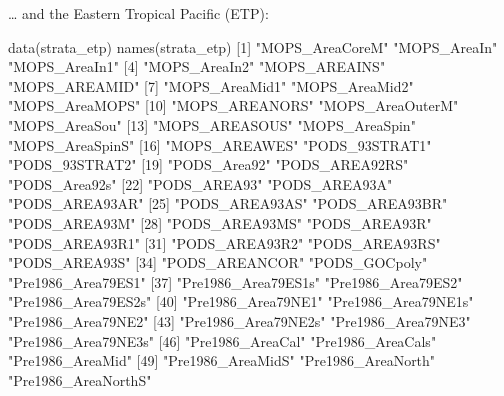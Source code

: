 \documentclass[
]{book}
\newenvironment{Shaded}{\begin{snugshade}}{\end{snugshade}}
\newcommand{\DecValTok}[1]{\textcolor[rgb]{0.00,0.00,0.81}{#1}}
\newcommand{\FunctionTok}[1]{\textcolor[rgb]{0.00,0.00,0.00}{#1}}
\newcommand{\NormalTok}[1]{#1}
\newcommand{\StringTok}[1]{\textcolor[rgb]{0.31,0.60,0.02}{#1}}
\begin{document}
\ldots{} and the Eastern Tropical Pacific (ETP):

\begin{Shaded}
\begin{Highlighting}[]
\FunctionTok{data}\NormalTok{(strata\_etp) }
\FunctionTok{names}\NormalTok{(strata\_etp)}
\NormalTok{ [}\DecValTok{1}\NormalTok{] }\StringTok{"MOPS\_AreaCoreM"}     \StringTok{"MOPS\_AreaIn"}        \StringTok{"MOPS\_AreaIn1"}      
\NormalTok{ [}\DecValTok{4}\NormalTok{] }\StringTok{"MOPS\_AreaIn2"}       \StringTok{"MOPS\_AREAINS"}       \StringTok{"MOPS\_AREAMID"}      
\NormalTok{ [}\DecValTok{7}\NormalTok{] }\StringTok{"MOPS\_AreaMid1"}      \StringTok{"MOPS\_AreaMid2"}      \StringTok{"MOPS\_AreaMOPS"}     
\NormalTok{[}\DecValTok{10}\NormalTok{] }\StringTok{"MOPS\_AREANORS"}      \StringTok{"MOPS\_AreaOuterM"}    \StringTok{"MOPS\_AreaSou"}      
\NormalTok{[}\DecValTok{13}\NormalTok{] }\StringTok{"MOPS\_AREASOUS"}      \StringTok{"MOPS\_AreaSpin"}      \StringTok{"MOPS\_AreaSpinS"}    
\NormalTok{[}\DecValTok{16}\NormalTok{] }\StringTok{"MOPS\_AREAWES"}       \StringTok{"PODS\_93STRAT1"}      \StringTok{"PODS\_93STRAT2"}     
\NormalTok{[}\DecValTok{19}\NormalTok{] }\StringTok{"PODS\_Area92"}        \StringTok{"PODS\_AREA92RS"}      \StringTok{"PODS\_Area92s"}      
\NormalTok{[}\DecValTok{22}\NormalTok{] }\StringTok{"PODS\_AREA93"}        \StringTok{"PODS\_AREA93A"}       \StringTok{"PODS\_AREA93AR"}     
\NormalTok{[}\DecValTok{25}\NormalTok{] }\StringTok{"PODS\_AREA93AS"}      \StringTok{"PODS\_AREA93BR"}      \StringTok{"PODS\_AREA93M"}      
\NormalTok{[}\DecValTok{28}\NormalTok{] }\StringTok{"PODS\_AREA93MS"}      \StringTok{"PODS\_AREA93R"}       \StringTok{"PODS\_AREA93R1"}     
\NormalTok{[}\DecValTok{31}\NormalTok{] }\StringTok{"PODS\_AREA93R2"}      \StringTok{"PODS\_AREA93RS"}      \StringTok{"PODS\_AREA93S"}      
\NormalTok{[}\DecValTok{34}\NormalTok{] }\StringTok{"PODS\_AREANCOR"}      \StringTok{"PODS\_GOCpoly"}       \StringTok{"Pre1986\_Area79ES1"} 
\NormalTok{[}\DecValTok{37}\NormalTok{] }\StringTok{"Pre1986\_Area79ES1s"} \StringTok{"Pre1986\_Area79ES2"}  \StringTok{"Pre1986\_Area79ES2s"}
\NormalTok{[}\DecValTok{40}\NormalTok{] }\StringTok{"Pre1986\_Area79NE1"}  \StringTok{"Pre1986\_Area79NE1s"} \StringTok{"Pre1986\_Area79NE2"} 
\NormalTok{[}\DecValTok{43}\NormalTok{] }\StringTok{"Pre1986\_Area79NE2s"} \StringTok{"Pre1986\_Area79NE3"}  \StringTok{"Pre1986\_Area79NE3s"}
\NormalTok{[}\DecValTok{46}\NormalTok{] }\StringTok{"Pre1986\_AreaCal"}    \StringTok{"Pre1986\_AreaCals"}   \StringTok{"Pre1986\_AreaMid"}   
\NormalTok{[}\DecValTok{49}\NormalTok{] }\StringTok{"Pre1986\_AreaMidS"}   \StringTok{"Pre1986\_AreaNorth"}  \StringTok{"Pre1986\_AreaNorthS"}

\end{Highlighting}
\end{Shaded}
\end{document}
